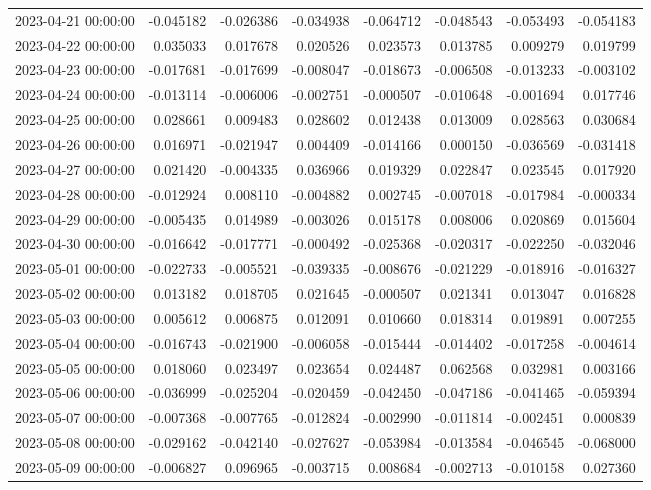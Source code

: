 \begin{tabular}{lrrrrrrr}
2023-04-21 00:00:00 & -0.045182 & -0.026386 & -0.034938 & -0.064712 & -0.048543 & -0.053493 & -0.054183 \\
2023-04-22 00:00:00 & 0.035033 & 0.017678 & 0.020526 & 0.023573 & 0.013785 & 0.009279 & 0.019799 \\
2023-04-23 00:00:00 & -0.017681 & -0.017699 & -0.008047 & -0.018673 & -0.006508 & -0.013233 & -0.003102 \\
2023-04-24 00:00:00 & -0.013114 & -0.006006 & -0.002751 & -0.000507 & -0.010648 & -0.001694 & 0.017746 \\
2023-04-25 00:00:00 & 0.028661 & 0.009483 & 0.028602 & 0.012438 & 0.013009 & 0.028563 & 0.030684 \\
2023-04-26 00:00:00 & 0.016971 & -0.021947 & 0.004409 & -0.014166 & 0.000150 & -0.036569 & -0.031418 \\
2023-04-27 00:00:00 & 0.021420 & -0.004335 & 0.036966 & 0.019329 & 0.022847 & 0.023545 & 0.017920 \\
2023-04-28 00:00:00 & -0.012924 & 0.008110 & -0.004882 & 0.002745 & -0.007018 & -0.017984 & -0.000334 \\
2023-04-29 00:00:00 & -0.005435 & 0.014989 & -0.003026 & 0.015178 & 0.008006 & 0.020869 & 0.015604 \\
2023-04-30 00:00:00 & -0.016642 & -0.017771 & -0.000492 & -0.025368 & -0.020317 & -0.022250 & -0.032046 \\
2023-05-01 00:00:00 & -0.022733 & -0.005521 & -0.039335 & -0.008676 & -0.021229 & -0.018916 & -0.016327 \\
2023-05-02 00:00:00 & 0.013182 & 0.018705 & 0.021645 & -0.000507 & 0.021341 & 0.013047 & 0.016828 \\
2023-05-03 00:00:00 & 0.005612 & 0.006875 & 0.012091 & 0.010660 & 0.018314 & 0.019891 & 0.007255 \\
2023-05-04 00:00:00 & -0.016743 & -0.021900 & -0.006058 & -0.015444 & -0.014402 & -0.017258 & -0.004614 \\
2023-05-05 00:00:00 & 0.018060 & 0.023497 & 0.023654 & 0.024487 & 0.062568 & 0.032981 & 0.003166 \\
2023-05-06 00:00:00 & -0.036999 & -0.025204 & -0.020459 & -0.042450 & -0.047186 & -0.041465 & -0.059394 \\
2023-05-07 00:00:00 & -0.007368 & -0.007765 & -0.012824 & -0.002990 & -0.011814 & -0.002451 & 0.000839 \\
2023-05-08 00:00:00 & -0.029162 & -0.042140 & -0.027627 & -0.053984 & -0.013584 & -0.046545 & -0.068000 \\
2023-05-09 00:00:00 & -0.006827 & 0.096965 & -0.003715 & 0.008684 & -0.002713 & -0.010158 & 0.027360 \\

\end{tabular}
